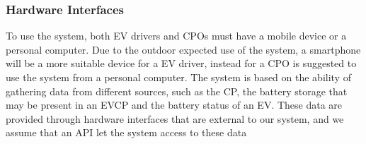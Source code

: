 \begin{figure}[H]
    \centering
    \newline
    \centering
    \newline
\end{figure}




\subsubsection{Hardware Interfaces}
To use the system, both EV drivers and CPOs must have a mobile device or a personal computer.
Due to the outdoor expected use of the system, a smartphone will be a more suitable device
for a EV driver, instead for a CPO is suggested to use the system from a personal computer.
The system is based on the ability of gathering data from different sources, such as the CP, the battery storage that may be present in an EVCP and the battery status of an EV. These data are provided through hardware interfaces that are external
to our system, and we assume that an API let the system access to these data

